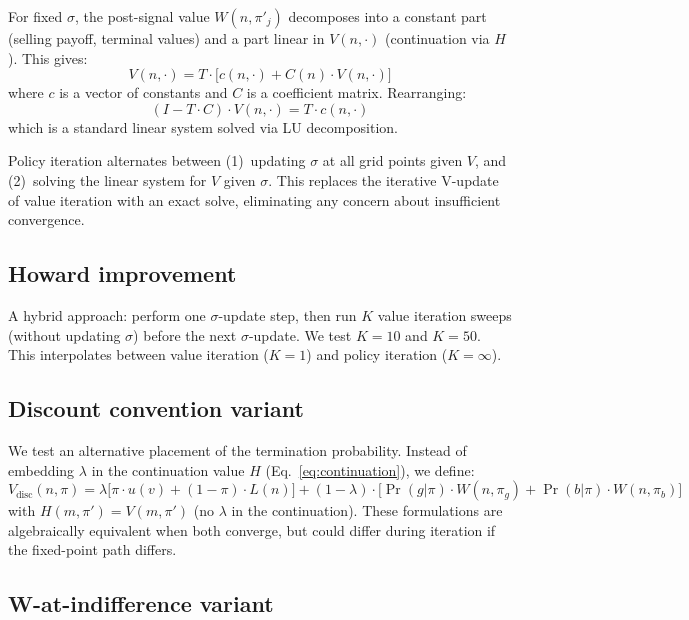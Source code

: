 \documentclass[11pt]{article}
\begin{document}
For fixed $\sigma$, the post-signal value $W(n, \pi'_j)$ decomposes into a
constant part (selling payoff, terminal values) and a part linear in
$V(n, \cdot)$ (continuation via $H$). This gives:
\begin{equation}
    V(n, \cdot) = T \cdot \bigl[c(n, \cdot) + C(n) \cdot V(n, \cdot)\bigr]
    \label{eq:linear_system}
\end{equation}
where $c$ is a vector of constants and $C$ is a coefficient matrix. Rearranging:
\[
    (I - T \cdot C) \cdot V(n, \cdot) = T \cdot c(n, \cdot)
\]
which is a standard linear system solved via LU decomposition.

Policy iteration alternates between (1)~updating $\sigma$ at all grid points
given $V$, and (2)~solving the linear system for $V$ given $\sigma$. This
replaces the iterative V-update of value iteration with an exact solve,
eliminating any concern about insufficient convergence.

\subsection{Howard improvement}

A hybrid approach: perform one $\sigma$-update step, then run $K$ value
iteration sweeps (without updating $\sigma$) before the next $\sigma$-update.
We test $K = 10$ and $K = 50$. This interpolates between value iteration
($K = 1$) and policy iteration ($K = \infty$).

\subsection{Discount convention variant}

We test an alternative placement of the termination probability. Instead of
embedding $\lambda$ in the continuation value $H$ (Eq.~\ref{eq:continuation}),
we define:
\[
    V_{\text{disc}}(n, \pi)
    = \lambda \bigl[\pi \cdot u(v) + (1 - \pi) \cdot L(n)\bigr]
    + (1 - \lambda) \cdot \bigl[\Pr(g|\pi) \cdot W(n, \pi_g)
    + \Pr(b|\pi) \cdot W(n, \pi_b)\bigr]
\]
with $H(m, \pi') = V(m, \pi')$ (no $\lambda$ in the continuation). These
formulations are algebraically equivalent when both converge, but could
differ during iteration if the fixed-point path differs.

\subsection{W-at-indifference variant}
\end{document}
